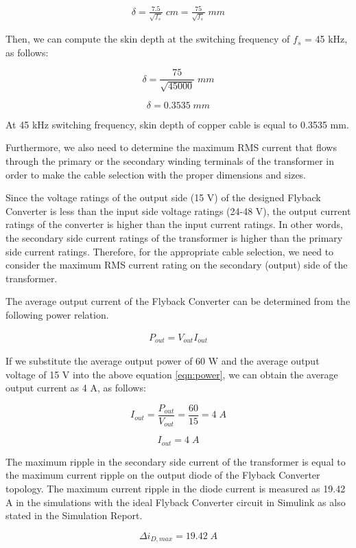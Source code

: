 \begin{align}
    \delta=\frac{7.5}{\sqrt{f_s}}\; cm = \frac{75}{\sqrt{f_s}}\; mm
    \label{eqn:skin2}
\end{align}

Then, we can compute the skin depth at the switching frequency of $f_s$ = 45 kHz, as follows:

$$ \delta=\frac{75}{\sqrt{45000}}\; mm $$

$$ \delta= 0.3535\; mm $$

At 45 kHz switching frequency, skin depth of copper cable is equal to 0.3535 mm.

Furthermore, we also need to determine the maximum RMS current that flows through the primary or the secondary winding terminals of the transformer in order to make the cable selection with the proper dimensions and sizes.

Since the voltage ratings of the output side (15 V) of the designed Flyback Converter is less than the input side voltage ratings (24-48 V), the output current ratings of the converter is higher than the input current ratings. In other words, the secondary side current ratings of the transformer is higher than the primary side current ratings. Therefore, for the appropriate cable selection, we need to consider the maximum RMS current rating on the secondary (output) side of the transformer.

The average output current of the Flyback Converter can be determined from the following power relation.

\begin{align}
    P_{out} = V_{out}I_{out}
    \label{eqn:power}
\end{align}

If we substitute the average output power of 60 W and the average output voltage of 15 V into the above equation \eqref{eqn:power}, we can obtain the average output current as 4 A, as follows:

$$ I_{out} = \frac{P_{out}}{V_{out}} = \frac{60}{15} = 4\;A $$

$$ I_{out} = 4\;A $$

The maximum ripple in the secondary side current of the transformer is equal to the maximum current ripple on the output diode of the Flyback Converter topology. The maximum current ripple in the diode current is measured as 19.42 A in the simulations with the ideal Flyback Converter circuit in Simulink as also stated in the Simulation Report.

$$ \Delta i_{D,max} = 19.42\;A $$

